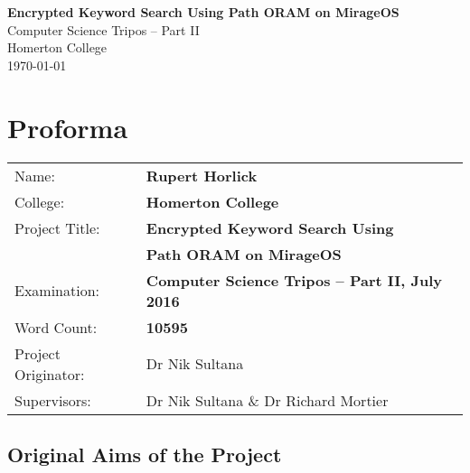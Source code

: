 \documentclass[12pt,a4paper,twoside,openright]{report}
\begin{document}




\pagestyle{empty}


\vspace*{60mm}
\begin{center}
\Huge
\textbf{Encrypted Keyword Search Using Path ORAM on MirageOS} \\[5mm]
Computer Science Tripos -- Part II \\[5mm]
Homerton College \\[5mm]
\today  %
\end{center}


\pagestyle{plain}

\chapter*{Proforma}

{\large
\begin{tabular}{ll}
Name:               & \bf Rupert Horlick                       \\
College:            & \bf Homerton College                     \\
Project Title:      & \bf Encrypted Keyword Search Using \\
& \bf Path ORAM on MirageOS \\
Examination:        & \bf Computer Science Tripos -- Part II, July 2016  \\
Word Count:         & \bf 10595\footnotemark[1] \\
Project Originator: & Dr Nik Sultana                    \\
Supervisors:         & Dr Nik Sultana \& Dr Richard Mortier                    \\
\end{tabular}
}

\section*{Original Aims of the Project}
\end{document}
